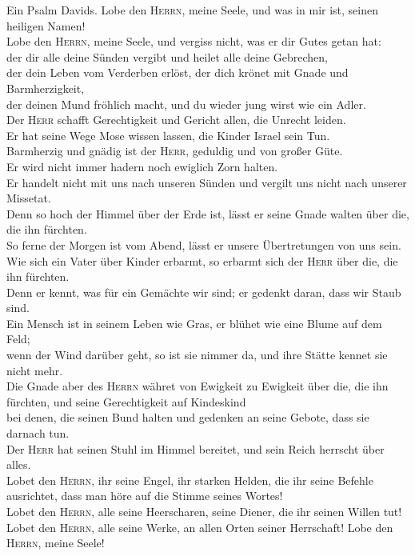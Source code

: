  Ein Psalm Davids. Lobe den \textsc{Herrn}, meine Seele,
und was in mir ist, seinen heiligen Namen!\\
 Lobe den \textsc{Herrn}, meine Seele, und vergiss nicht,
was er dir Gutes getan hat:\\
 der dir alle deine Sünden vergibt und heilet alle deine
Gebrechen,\\
 der dein Leben vom Verderben erlöst, der dich krönet mit
Gnade und Barmherzigkeit,\\
 der deinen Mund fröhlich macht, und du wieder jung wirst
wie ein Adler.\\
 Der \textsc{Herr} schafft Gerechtigkeit und Gericht
allen, die Unrecht leiden.\\
 Er hat seine Wege Mose wissen lassen, die Kinder Israel
sein Tun.\\
 Barmherzig und gnädig ist der \textsc{Herr}, geduldig und
von großer Güte.\\
 Er wird nicht immer hadern noch ewiglich Zorn halten.\\
 Er handelt nicht mit uns nach unseren Sünden und vergilt
uns nicht nach unserer Missetat.\\
 Denn so hoch der Himmel über der Erde ist, lässt er
seine Gnade walten über die, die ihn fürchten.\\
 So ferne der Morgen ist vom Abend, lässt er unsere
Übertretungen von uns sein.\\
 Wie sich ein Vater über Kinder erbarmt, so erbarmt sich
der \textsc{Herr} über die, die ihn fürchten.\\
 Denn er kennt, was für ein Gemächte wir sind; er gedenkt
daran, dass wir Staub sind.\\
 Ein Mensch ist in seinem Leben wie Gras, er blühet wie
eine Blume auf dem Feld;\\
 wenn der Wind darüber geht, so ist sie nimmer da, und
ihre Stätte kennet sie nicht mehr.\\
 Die Gnade aber des \textsc{Herrn} währet von Ewigkeit zu
Ewigkeit über die, die ihn fürchten, und seine Gerechtigkeit auf
Kindeskind\\
 bei denen, die seinen Bund halten und gedenken an seine
Gebote, dass sie darnach tun.\\
 Der \textsc{Herr} hat seinen Stuhl im Himmel bereitet,
und sein Reich herrscht über alles.\\
 Lobet den \textsc{Herrn}, ihr seine Engel, ihr starken
Helden, die ihr seine Befehle ausrichtet, dass man höre auf die Stimme
seines Wortes!\\
 Lobet den \textsc{Herrn}, alle seine Heerscharen, seine
Diener, die ihr seinen Willen tut!\\
 Lobet den \textsc{Herrn}, alle seine Werke, an allen
Orten seiner Herrschaft! Lobe den \textsc{Herrn}, meine Seele!

